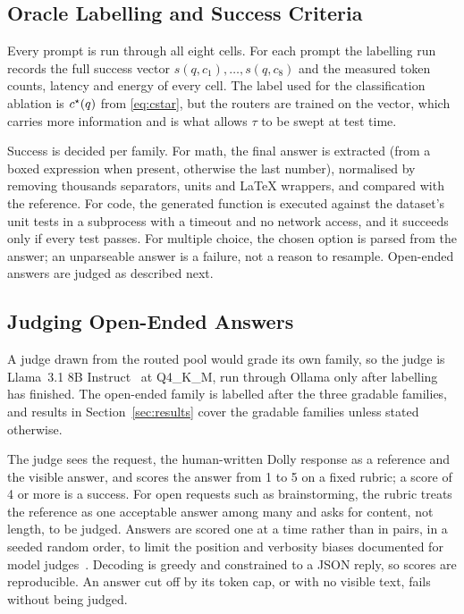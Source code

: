 \subsection{Oracle Labelling and Success Criteria}
\label{sec:labelling}

Every prompt is run through all eight cells. For each prompt the labelling
run records the full success vector $s(q, c_1), \dots, s(q, c_8)$ and the
measured token counts, latency and energy of every cell. The label used for
the classification ablation is $c^{\star}(q)$ from \eqref{eq:cstar}, but the
routers are trained on the vector, which carries more information and is
what allows $\tau$ to be swept at test time.

Success is decided per family. For math, the final answer is extracted
(from a boxed expression when present, otherwise the last number), normalised
by removing thousands separators, units and \LaTeX{} wrappers, and compared
with the reference. For code, the generated function is executed against
the dataset's unit tests in a subprocess with a timeout and no network
access, and it succeeds only if every test passes. For multiple choice, the
chosen option is parsed from the answer; an unparseable answer is a failure,
not a reason to resample. Open-ended answers are judged as described next.

\subsection{Judging Open-Ended Answers}
\label{sec:judge}

A judge drawn from the routed pool would grade its own family, so the judge
is Llama~3.1 8B Instruct~\cite{grattafiori2024llama3} at Q4\_K\_M, run
through Ollama only after labelling has finished. The open-ended family is
labelled after the three gradable families, and results in
Section~\ref{sec:results} cover the gradable families unless stated
otherwise.

The judge sees the request, the human-written Dolly response as a reference
and the visible answer, and scores the answer from 1 to 5 on a fixed rubric;
a score of 4 or more is a success. For open requests such as brainstorming,
the rubric treats the reference as one acceptable answer among many and asks
for content, not length, to be judged. Answers are scored one at a time
rather than in pairs, in a seeded random order, to limit the position and
verbosity biases documented for model judges~\cite{zheng2023judging}.
Decoding is greedy and constrained to a JSON reply, so scores are
reproducible. An answer cut off by its token cap, or with no visible text,
fails without being judged.

